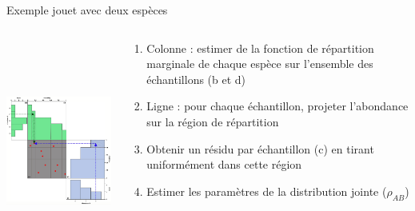 \documentclass[11pt]{beamer}
\begin{document}
\begin{frame}{Exemple jouet avec deux espèces}
\begin{columns}
\begin{column}{0.54\linewidth}
 
\includegraphics[height=7.3cm]{images/copula.png}
 
\end{column}
\begin{column}{0.45\linewidth}
\pause
\begin{enumerate}
\item Colonne : estimer de la fonction de répartition marginale de chaque espèce  sur l'ensemble des échantillons (b et d)\pause
\item Ligne : pour chaque échantillon, projeter l'abondance sur la région de répartition \pause
\item Obtenir un résidu par échantillon (c) en tirant uniformément dans cette région
\item Estimer les paramètres de la distribution jointe ($\rho_{AB}$)
\end{enumerate}
\end{column}
\end{columns}
\end{frame}
\end{document}
